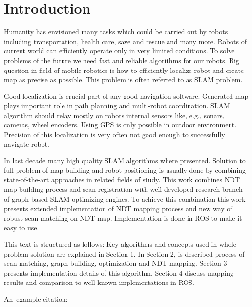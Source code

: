 \chapter*{Introduction}
Humanity has envisioned many tasks which could be carried out by robots including transportation, health care, save and rescue and many more. Robots of current world can efficiently operate only in very limited conditions. To solve problems of the future we need fast and reliable algorithms for our robots. Big question in field of mobile robotics is how to efficiently localize robot and create map as precise as possible. This problem is often referred to as \gls{SLAM} problem.

Good localization is crucial part of any good navigation software. Generated map plays important role in path planning and  multi-robot coordination. SLAM algorithm should relay mostly on robots internal sensors like, e.g., sonars, cameras, wheel encoders. Using \gls{GPS} is only possible in outdoor environment. Precision of this localization is very often not good enough to successfully navigate robot.

In last decade many high quality \gls{SLAM} algorithms where presented. Solution to full problem of map building and robot positioning is usually done by combining state-of-the-art approaches in related fields of study. This work combines \gls{NDT} map building process and scan registration with well developed research branch of graph-based \gls{SLAM} optimizing engines. To achieve this combination this work presents extended implementation of \gls{NDT} mapping process and new way of robust scan-matching on \gls{NDT} map. Implementation is done in \gls{ROS} to make it easy to use.

This text is structured as follows: Key algorithms and concepts used in whole problem solution are explained in Section 1. In Section 2, is described process of scan matching, graph building, optimization and NDT mapping. Section 3 presents implementation details of this algorithm. Section 4 discuss mapping results and comparison to well known implementations in ROS.  

An~example citation: \cite{Andel07}

